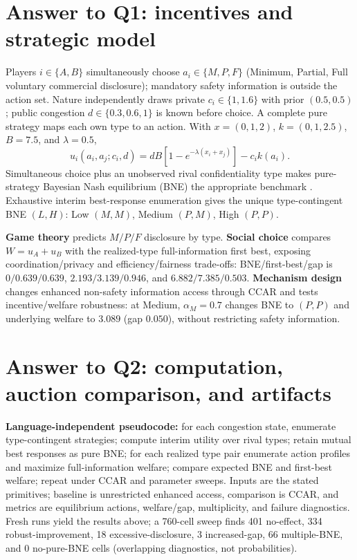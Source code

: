 \section{Answer to Q1: incentives and strategic model}
Players $i\in\{A,B\}$ simultaneously choose $a_i\in\{M,P,F\}$ (Minimum, Partial, Full voluntary commercial disclosure); mandatory safety information is outside the action set. Nature independently draws private $c_i\in\{1,1.6\}$ with prior $(0.5,0.5)$; public congestion $d\in\{0.3,0.6,1\}$ is known before choice. A complete pure strategy maps each own type to an action. With $x=(0,1,2)$, $k=(0,1,2.5)$, $B=7.5$, and $\lambda=0.5$,
\[
u_i(a_i,a_j;c_i,d)=dB[1-e^{-\lambda(x_i+x_j)}]-c_i k(a_i).
\]
Simultaneous choice plus an unobserved rival confidentiality type makes pure-strategy Bayesian Nash equilibrium (BNE) the appropriate benchmark \cite{harsanyi1967}. Exhaustive interim best-response enumeration gives the unique type-contingent BNE $(L,H)$: Low $(M,M)$, Medium $(P,M)$, High $(P,P)$.

\textbf{Game theory} predicts $M/P/F$ disclosure by type. \textbf{Social choice} compares $W=u_A+u_B$ with the realized-type full-information first best, exposing coordination/privacy and efficiency/fairness trade-offs: BNE/first-best/gap is $0/0.639/0.639$, $2.193/3.139/0.946$, and $6.882/7.385/0.503$. \textbf{Mechanism design} changes enhanced non-safety information access through CCAR and tests incentive/welfare robustness: at Medium, $\alpha_M=0.7$ changes BNE to $(P,P)$ and underlying welfare to $3.089$ (gap $0.050$), without restricting safety information.

\section{Answer to Q2: computation, auction comparison, and artifacts}
\textbf{Language-independent pseudocode:} for each congestion state, enumerate type-contingent strategies; compute interim utility over rival types; retain mutual best responses as pure BNE; for each realized type pair enumerate action profiles and maximize full-information welfare; compare expected BNE and first-best welfare; repeat under CCAR and parameter sweeps. Inputs are the stated primitives; baseline is unrestricted enhanced access, comparison is CCAR, and metrics are equilibrium actions, welfare/gap, multiplicity, and failure diagnostics. Fresh runs yield the results above; a 760-cell sweep finds 401 no-effect, 334 robust-improvement, 18 excessive-disclosure, 3 increased-gap, 66 multiple-BNE, and 0 no-pure-BNE cells (overlapping diagnostics, not probabilities).

